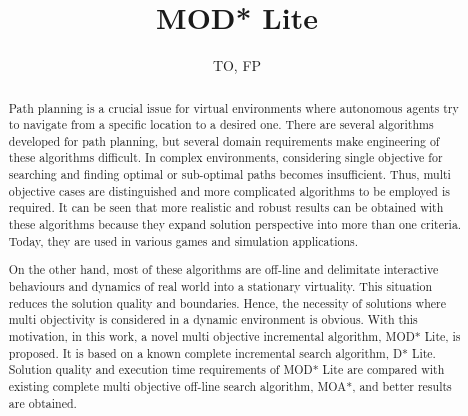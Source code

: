 \documentclass[10pt,journal]{IEEEtran}
\begin{document}
\title{MOD* Lite}

\author{TO, FP}

\maketitle

\begin{abstract}
Path planning is a crucial issue for virtual environments where autonomous agents try to navigate from a specific location to a desired one. There are several algorithms developed for path planning, but several domain requirements make engineering of these algorithms difficult. In complex environments, considering single objective for searching and finding optimal or sub-optimal paths becomes insufficient. Thus, multi objective cases are distinguished and more complicated algorithms to be employed is required. It can be seen that more realistic and robust results can be obtained with these algorithms because they expand solution perspective into more than one criteria. Today, they are used in various games and simulation applications.

On the other hand, most of these algorithms are off-line  and delimitate interactive behaviours and dynamics of real world into a stationary virtuality. This situation reduces the solution quality and boundaries. Hence, the necessity of solutions where multi objectivity is considered in a dynamic environment is obvious. With this motivation, in this work, a novel multi objective incremental algorithm, MOD* Lite, is proposed. It is  based on a known complete incremental search algorithm, D* Lite. Solution quality and execution time requirements of MOD* Lite are compared with existing complete multi objective off-line search algorithm, MOA*, and better results are obtained.
\end{abstract}











{}

\end{document}
